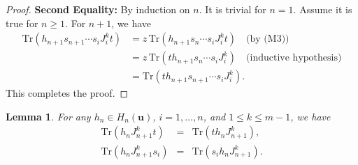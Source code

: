 \documentclass[a4paper, oneside]{amsart}
\numberwithin{equation}{section}
\newtheorem{lemma}[equation]{Lemma}
\theoremstyle{definition}
\theoremstyle{remark}
\begin{document}
\begin{proof}
\textbf{Second Equality:} By induction on $n$. It is trivial for $n = 1$. Assume it is true for $n \geq 1$. For $n+1$, we have
\begin{align*}
    \mathrm{Tr}(h_{n+1} s_{n+1} \cdots s_i J_i^k t)
    &= z\,\mathrm{Tr}(h_{n+1} s_{n} \cdots s_i J_i^k t) \quad \text{(by (M3))} \\
    &= z\,\mathrm{Tr}(t h_{n+1} s_{n} \cdots s_i J_i^k) \quad \text{(inductive hypothesis)} \\
    &= \mathrm{Tr}(t h_{n+1} s_{n+1} \cdots s_i J_i^k).
\end{align*}
This completes the proof.
\end{proof}
\begin{lemma}\label{Lemm:JM-Type-IV}For any $h_{n}\in H_{n}(\boldsymbol{u})$, $i=1, \ldots, n$, and $1\leq k\leq m-1$, we have
\begin{eqnarray*}
\mathrm{Tr}(h_{n}J_{n+1}^kt)&=&\mathrm{Tr}(th_{n}J_{n+1}^k),\\
\mathrm{Tr}(h_{n}J_{n+1}^ks_i)&=&\mathrm{Tr}(s_ih_{n}J_{n+1}^k).
\end{eqnarray*}
\end{lemma}
\end{document}
